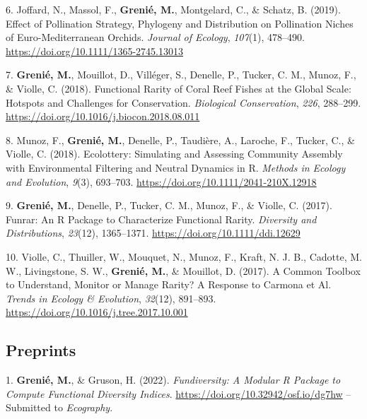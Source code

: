 \documentclass[10pt,a4paper,]{article}
\newcommand{\CSLBlock}[1]{#1\hfill\break}
\begin{document}
\leavevmode\hypertarget{ref-Joffard_Effect_2019}{}%
6. Joffard, N., Massol, F., \textbf{Grenié, M.}, Montgelard, C., \&
Schatz, B. (2019). Effect of Pollination Strategy, Phylogeny and
Distribution on Pollination Niches of Euro-Mediterranean Orchids.
\emph{Journal of Ecology}, \emph{107}(1), 478--490.
\url{https://doi.org/10.1111/1365-2745.13013}

\leavevmode\hypertarget{ref-Grenie_Functional_2018}{}%
7. \textbf{Grenié, M.}, Mouillot, D., Villéger, S., Denelle, P., Tucker,
C. M., Munoz, F., \& Violle, C. (2018). Functional Rarity of Coral Reef
Fishes at the Global Scale: Hotspots and Challenges for Conservation.
\emph{Biological Conservation}, \emph{226}, 288--299.
\url{https://doi.org/10.1016/j.biocon.2018.08.011}

\leavevmode\hypertarget{ref-Munoz_ecolottery_2018}{}%
8. Munoz, F., \textbf{Grenié, M.}, Denelle, P., Taudière, A., Laroche,
F., Tucker, C., \& Violle, C. (2018). Ecolottery: Simulating and
Assessing Community Assembly with Environmental Filtering and Neutral
Dynamics in R. \emph{Methods in Ecology and Evolution}, \emph{9}(3),
693--703. \url{https://doi.org/10.1111/2041-210X.12918}

\leavevmode\hypertarget{ref-Grenie_funrar_2017}{}%
9. \textbf{Grenié, M.}, Denelle, P., Tucker, C. M., Munoz, F., \&
Violle, C. (2017). Funrar: An R Package to Characterize Functional
Rarity. \emph{Diversity and Distributions}, \emph{23}(12), 1365--1371.
\url{https://doi.org/10.1111/ddi.12629}

\leavevmode\hypertarget{ref-Violle_Common_2017}{}%
10. Violle, C., Thuiller, W., Mouquet, N., Munoz, F., Kraft, N. J. B.,
Cadotte, M. W., Livingstone, S. W., \textbf{Grenié, M.}, \& Mouillot, D.
(2017). A Common Toolbox to Understand, Monitor or Manage Rarity? A
Response to Carmona et Al. \emph{Trends in Ecology \& Evolution},
\emph{32}(12), 891--893.
\url{https://doi.org/10.1016/j.tree.2017.10.001}

\hypertarget{preprints}{%
\subsection{Preprints}\label{preprints}}

\hypertarget{bibliography}{}
\leavevmode\hypertarget{ref-Grenie_fundiversity_2022}{}%
1. \textbf{Grenié, M.}, \& Gruson, H. (2022). \emph{Fundiversity: A
Modular R Package to Compute Functional Diversity Indices}.
\url{https://doi.org/10.32942/osf.io/dg7hw}
\CSLBlock{-- Submitted to \emph{Ecography}.}
\end{document}
